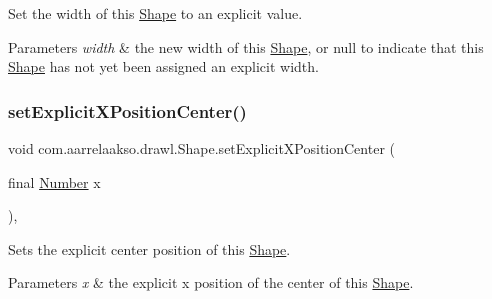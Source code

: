 Set the width of this \hyperlink{classcom_1_1aarrelaakso_1_1drawl_1_1_shape}{Shape} to an explicit value. 


\begin{DoxyParams}{Parameters}
{\em width} & the new width of this \hyperlink{classcom_1_1aarrelaakso_1_1drawl_1_1_shape}{Shape}, or {\ttfamily null} to indicate that this \hyperlink{classcom_1_1aarrelaakso_1_1drawl_1_1_shape}{Shape} has not yet been assigned an explicit width. \\
\hline
\end{DoxyParams}
\mbox{\label{classcom_1_1aarrelaakso_1_1drawl_1_1_shape_a28c766b414be0cd8767093f9be557dbd}} 
\subsubsection{\texorpdfstring{set\+Explicit\+X\+Position\+Center()}{setExplicitXPositionCenter()}\hspace{0.1cm}{\footnotesize\ttfamily [1/2]}}
{\footnotesize\ttfamily void com.\+aarrelaakso.\+drawl.\+Shape.\+set\+Explicit\+X\+Position\+Center (\begin{DoxyParamCaption}\item[{final \hyperlink{interfacecom_1_1aarrelaakso_1_1drawl_1_1_number}{Number}}]{x }\end{DoxyParamCaption})\hspace{0.3cm}{\ttfamily [protected]}, {\ttfamily [inherited]}}



Sets the explicit center position of this \hyperlink{classcom_1_1aarrelaakso_1_1drawl_1_1_shape}{Shape}. 


\begin{DoxyParams}{Parameters}
{\em x} & the explicit x position of the center of this \hyperlink{classcom_1_1aarrelaakso_1_1drawl_1_1_shape}{Shape}. \\
\hline
\end{DoxyParams}
\mbox{\label{classcom_1_1aarrelaakso_1_1drawl_1_1_shape_a271cd9377952616a30a434b22e22000a}} 

